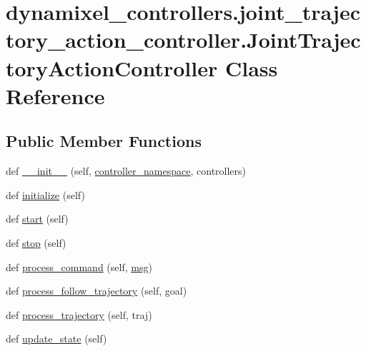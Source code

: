 \hypertarget{classdynamixel__controllers_1_1joint__trajectory__action__controller_1_1_joint_trajectory_action_controller}{}\section{dynamixel\+\_\+controllers.\+joint\+\_\+trajectory\+\_\+action\+\_\+controller.\+Joint\+Trajectory\+Action\+Controller Class Reference}
\label{classdynamixel__controllers_1_1joint__trajectory__action__controller_1_1_joint_trajectory_action_controller}
\subsection*{Public Member Functions}
\begin{DoxyCompactItemize}
\item 
def \hyperlink{classdynamixel__controllers_1_1joint__trajectory__action__controller_1_1_joint_trajectory_action_controller_a78e8f0b1313976d80c17365eca5f2de4}{\+\_\+\+\_\+init\+\_\+\+\_\+} (self, \hyperlink{classdynamixel__controllers_1_1joint__trajectory__action__controller_1_1_joint_trajectory_action_controller_a6fe0cdf9780014b34ffcee053b01b420}{controller\+\_\+namespace}, controllers)
\item 
def \hyperlink{classdynamixel__controllers_1_1joint__trajectory__action__controller_1_1_joint_trajectory_action_controller_a79e68136bd05bdd0e6efcf2b882c30dd}{initialize} (self)
\item 
def \hyperlink{classdynamixel__controllers_1_1joint__trajectory__action__controller_1_1_joint_trajectory_action_controller_a4d40c093c5c25f5dff942a4c3ad69eec}{start} (self)
\item 
def \hyperlink{classdynamixel__controllers_1_1joint__trajectory__action__controller_1_1_joint_trajectory_action_controller_a88b8801366d5ebdcbb1cc3a975bec4df}{stop} (self)
\item 
def \hyperlink{classdynamixel__controllers_1_1joint__trajectory__action__controller_1_1_joint_trajectory_action_controller_a86f9e610dbac6f1de79f4ff95448daa9}{process\+\_\+command} (self, \hyperlink{classdynamixel__controllers_1_1joint__trajectory__action__controller_1_1_joint_trajectory_action_controller_ae0386896abcb73f639f3b9c9348149a6}{msg})
\item 
def \hyperlink{classdynamixel__controllers_1_1joint__trajectory__action__controller_1_1_joint_trajectory_action_controller_afbfa29ff56121dd37e2dc579e8a32da2}{process\+\_\+follow\+\_\+trajectory} (self, goal)
\item 
def \hyperlink{classdynamixel__controllers_1_1joint__trajectory__action__controller_1_1_joint_trajectory_action_controller_a377f9da3c6ee849f3a12ffc08c03f2df}{process\+\_\+trajectory} (self, traj)
\item 
def \hyperlink{classdynamixel__controllers_1_1joint__trajectory__action__controller_1_1_joint_trajectory_action_controller_af6eaafc747de86e310755b0638c2c9ad}{update\+\_\+state} (self)
\end{DoxyCompactItemize}
